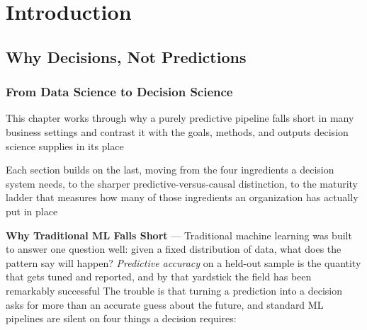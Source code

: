 
\chapter{Introduction}

\section{Why Decisions, Not Predictions}
\label{chap:why-decisions-not-predictions}

\subsection{From Data Science to Decision Science}
\label{sec:data-science-to-decision-science}

This chapter works through why a purely predictive pipeline falls short in many business
settings and contrast it with the goals, methods, and outputs decision science supplies
in its place

Each section builds on the last, moving from the four ingredients a decision system
needs, to the sharper predictive-versus-causal distinction, to the maturity ladder
that measures how many of those ingredients an organization has actually put in place

\textbf{Why Traditional ML Falls Short} --- Traditional machine learning was built
to answer one question well: given a fixed distribution of data, what does the pattern
say will happen? \emph{Predictive accuracy} on a held-out sample is the quantity
that gets tuned and reported, and by that yardstick the field has been
remarkably successful
%
The trouble is that turning a prediction into a decision asks for more than an
accurate guess about the future, and standard ML pipelines are silent on four things
a decision requires:

